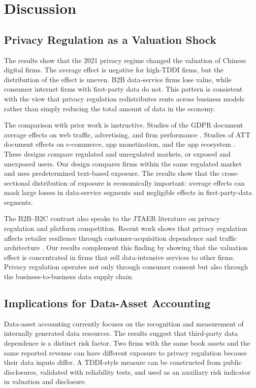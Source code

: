\section{Discussion}
\label{sec:discussion}

\subsection{Privacy Regulation as a Valuation Shock}

The results show that the 2021 privacy regime changed the valuation of Chinese digital firms. The average effect is negative for high-TDDI firms, but the distribution of the effect is uneven. B2B data-service firms lose value, while consumer internet firms with first-party data do not. This pattern is consistent with the view that privacy regulation redistributes rents across business models rather than simply reducing the total amount of data in the economy.

The comparison with prior work is instructive. Studies of the GDPR document average effects on web traffic, advertising, and firm performance \cite{goldberg2024,aridor2020}. Studies of ATT document effects on e-commerce, app monetization, and the app ecosystem \cite{aridor2024,kesler2023,cheyre2024}. These designs compare regulated and unregulated markets, or exposed and unexposed users. Our design compares firms within the same regulated market and uses predetermined text-based exposure. The results show that the cross-sectional distribution of exposure is economically important: average effects can mask large losses in data-service segments and negligible effects in first-party-data segments.

The B2B--B2C contrast also speaks to the JTAER literature on privacy regulation and platform competition. Recent work shows that privacy regulation affects retailer resilience through customer-acquisition dependence and traffic architecture \cite{chen2026}. Our results complement this finding by showing that the valuation effect is concentrated in firms that sell data-intensive services to other firms. Privacy regulation operates not only through consumer consent but also through the business-to-business data supply chain.

\subsection{Implications for Data-Asset Accounting}

Data-asset accounting currently focuses on the recognition and measurement of internally generated data resources. The results suggest that third-party data dependence is a distinct risk factor. Two firms with the same book assets and the same reported revenue can have different exposure to privacy regulation because their data inputs differ. A TDDI-style measure can be constructed from public disclosures, validated with reliability tests, and used as an auxiliary risk indicator in valuation and disclosure.

